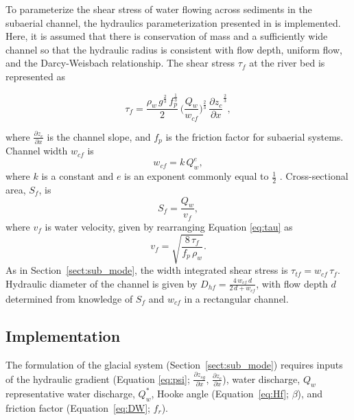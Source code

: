 \documentclass[11pt]{article}
\begin{document}
\begin{spacing}{1}
  To parameterize the shear stress of water flowing across sediments in the subaerial channel,  the hydraulics parameterization presented in \citet{tucker1997} is implemented.
  Here, it is assumed that there is conservation of mass and a sufficiently wide channel so that the hydraulic radius is consistent with flow depth, uniform flow, and the Darcy-Weisbach relationship.
  The shear stress $\tau_f$ at the river bed is represented as
  \begin{linenomath*}
    \begin{equation}
      \label{eq:DW_tau}
      \tau_f=\frac{\rho_w\,g^{\frac{2}{3}}\,f_p^{\frac{1}{3}}}{2}\, \Big(\frac{Q_w}{w_{cf}} \Big)^{\frac{2}{3}} \,\frac{\partial z_c}{\partial x}^{\frac{2}{3}},
    \end{equation}
  \end{linenomath*}
  where $\frac{\partial z_c}{\partial x}$ is the channel slope, and $f_p$ is the friction factor for subaerial systems.
  Channel width $w_{cf}$ is 
  \begin{equation}
    \label{eq:wcf}
    w_{cf} = k \, Q_w^e,
  \end{equation}
  where $k$ is a constant and $e$ is an exponent commonly equal to $\frac{1}{2}$ \citep{leopold1953}.
  Cross-sectional area, $ S_f$, is 
  \begin{equation}
    \label{eq:Sf}
    S_f = \frac{Q_w}{v_f},
  \end{equation}
  where $v_f$ is water velocity, given by rearranging Equation \ref{eq:tau} as
  \begin{equation}
    \label{eq:vf}
    v_f = \sqrt{\frac{8\,\tau_f}{f_p\,\rho_w}}.
  \end{equation}
  As in Section~\ref{sect:sub_mode}, the width integrated shear stress is $\tau_{tf}=w_{cf}\,\tau_f$.
  Hydraulic diameter of the channel is given by $D_{hf} = \frac{4\,w_{cf}\,d}{2\,d+w_{cf}}$, with flow depth $d$ determined from knowledge of $S_f$ and $w_{cf}$ in a rectangular channel.
  
  \subsection{Implementation}
  
  The formulation of the glacial system (Section~\ref{sect:sub_mode}) requires inputs of the hydraulic gradient (Equation \ref{eq:psi}; $\frac{\partial z_{sg}}{\partial x}$, $\frac{\partial z_{c}}{\partial x}$), water discharge, $Q_w$ representative water discharge, $Q_w^*$,  Hooke angle (Equation~\ref{eq:Hf}; $\beta$), and friction factor (Equation~\ref{eq:DW}; $f_r$).


\end{spacing}
\end{document}
